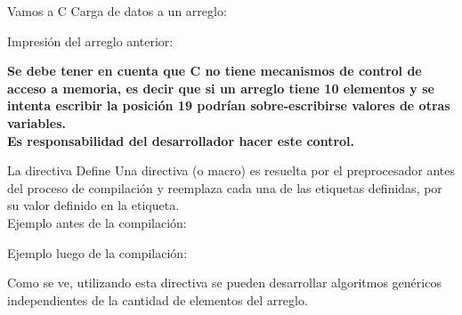 \documentclass[xcolor=pdftex,table,11pt]{beamer}
\begin{document}
\begin{frame}[allowframebreaks]{Vamos a C}
Carga de datos a un arreglo:
\codesetstylefrombeamer
{}

\newpage
Impresión del arreglo anterior:
\codesetstylefrombeamer
{}


\href{https://github.com/danis963/informaticaI_IUA/blob/main/c/src/8-array_load_print.c}{}

\textbf{Se debe tener en cuenta que C no tiene mecanismos de control de acceso a memoria, es decir que si un arreglo tiene 10 elementos y se intenta escribir la posición 19 podrían sobre-escribirse valores de otras variables. \\
Es responsabilidad del desarrollador hacer este control.}

\end{frame}


\begin{frame}{La directiva Define}
Una directiva (o macro) es resuelta por el preprocesador antes del proceso de compilación y reemplaza cada una de las etiquetas definidas, por su valor definido en la etiqueta.\\
\vspace{0.5cm}
Ejemplo antes de la compilación:
\codesetstylefrombeamer
{}

Ejemplo luego de la compilación:
\codesetstylefrombeamer
{}


\vspace{0.5cm}
Como se ve, utilizando esta directiva se pueden desarrollar algoritmos genéricos independientes de la cantidad de elementos del arreglo.



\end{frame}
\end{document}
